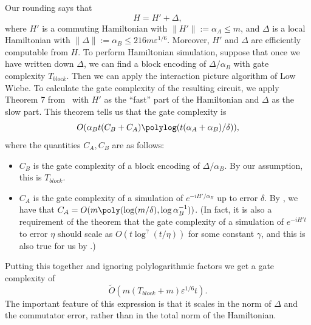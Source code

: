 \documentclass[11pt]{article}
\theoremstyle{plain}
\newcommand{\eps}{\varepsilon}
\begin{document}
    Our rounding says that
    \[ H = H' + \Delta,\]
    where $H'$ is a commuting Hamiltonian with $\|H'\| := \alpha_A \leq m$, and $\Delta$ is a local Hamiltonian with $\|\Delta\| := \alpha_B  \leq 216 m \eps^{1/6}$. Moreover, $H'$ and $\Delta$ are efficiently computable from $H$. To perform Hamiltonian simulation, suppose that once we have written down $\Delta$, we can find a block encoding of $\Delta/\alpha_B$ with gate complexity $T_{block}$. Then we can apply the interaction picture algorithm of Low Wiebe. To calculate the gate complexity of the resulting circuit, we apply Theorem 7 from~\cite{low2018hamiltonian} with $H'$ as the ``fast'' part of the Hamiltonian and $\Delta$ as the slow part. 
    This theorem tells us that the gate complexity is
    \[O(\alpha_B t(C_B + C_A)\polylog(t(\alpha_A + \alpha_B)/\delta)),\]
    where the quantities $C_A, C_B$ are as follows:
    \begin{itemize}
        \item $C_B$ is the gate complexity of a block encoding of $\Delta/\alpha_B$. By our assumption, this is $T_{block}$. 
        \item $C_A$ is the gate complexity of a simulation of $e^{-iH'/\alpha_B}$ up to error $\delta$. By , we have that $C_A = O(m \poly(\log(m/\delta), \log \alpha_B^{-1}))$. (In fact, it is also a requirement of the theorem that the gate complexity of a simulation of $e^{-iH't}$ to error $\eta$ should scale as $O(t \log^{\gamma}(t/\eta))$ for some constant $\gamma$, and this is also true for us by .) 
    \end{itemize}
    Putting this together and ignoring polylogarithmic factors we get a gate complexity of 
    \[ \tilde{O}(m(T_{block} + m) \eps^{1/6} t).\]
    The important feature of this expression is that it scales in the norm of $\Delta$ and the commutator error, rather than in the total norm of the Hamiltonian.
\printbibliography

\appendix
\end{document}
